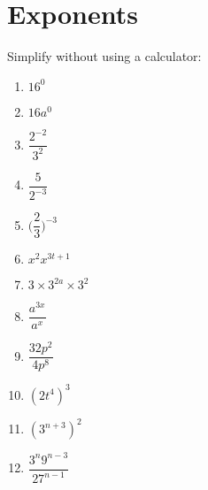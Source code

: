 \chapter{Exponents}
\begin{exercises}{}{
Simplify without using a calculator:
\begin{multicols}{2}
\begin{enumerate}[label=\textbf{\arabic*}., itemsep=5pt]
 \item $16^0$
 \item $16a^0$
 \item $\dfrac{2^{-2}}{3^2}$
 \item $ \dfrac{5}{2^{-3}}$
 \item $ \Big(\dfrac{2}{3}\Big)^{-3} $
 \item $ x^2 x^{3t+1} $
 \item $ 3 \times 3^{2a} \times 3^2$
 \item $ \dfrac{a^{3x}}{a^x} $
 \item $ \dfrac{32p^2}{4p^8}$
 \item $ (2t^4)^3$
 \item $ (3^{n+3})^2$
 \item $ \dfrac{3^n 9^{n-3}}{27^{n-1}}$
\end{enumerate}
\end{multicols}
}
\end{exercises}


